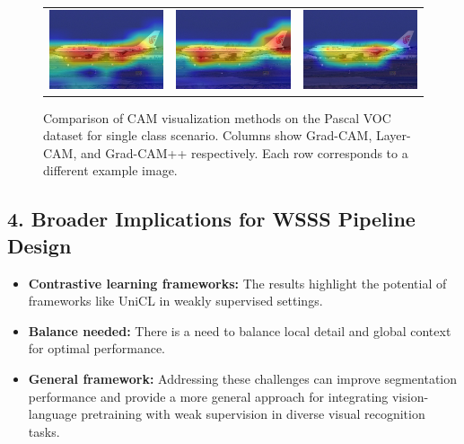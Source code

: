 \begin{figure}[thbp]
\begin{center}
{\begin{tabular}{c c c}
        \includegraphics[width=0.18\linewidth, height=0.18\linewidth]{figures/cams/gradcam/2008_003976_0} &
        \includegraphics[width=0.18\linewidth, height=0.18\linewidth]{figures/cams/layercam/2008_003976_0} &
        \includegraphics[width=0.18\linewidth, height=0.18\linewidth]{figures/cams/gradcampp/2008_003976_0} \\

      \end{tabular}
    }
  \end{center}

  \caption{Comparison of CAM visualization methods on the Pascal VOC dataset for single class scenario. Columns show Grad-CAM, Layer-CAM, and Grad-CAM++ respectively. Each row corresponds to a different example image.}
  \label{fig:cam_variation_singleclass}
\end{figure}


\subsection*{4. Broader Implications for WSSS Pipeline Design}
\begin{itemize}
	\item \textbf{Contrastive learning frameworks:} The results highlight the potential of frameworks like UniCL in weakly supervised settings.
	\item \textbf{Balance needed:} There is a need to balance local detail and global context for optimal performance.
	\item \textbf{General framework:} Addressing these challenges can improve segmentation performance and provide a more general approach for integrating vision-language pretraining with weak supervision in diverse visual recognition tasks.
\end{itemize}
